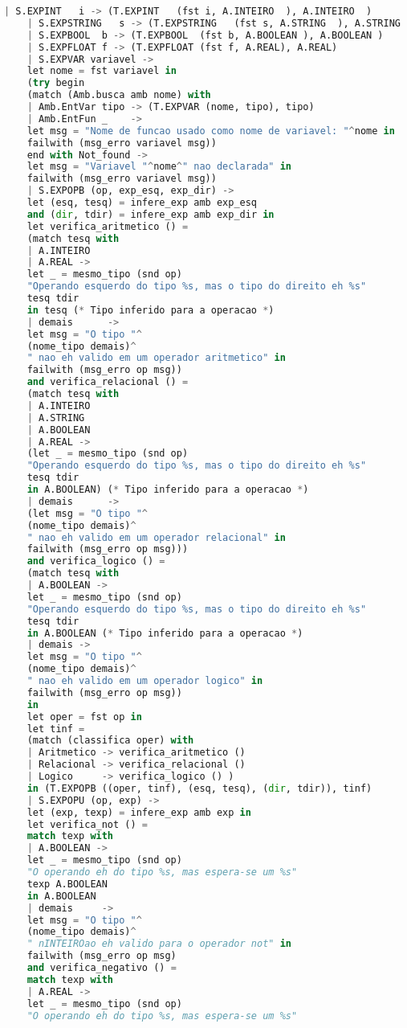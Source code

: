 \documentclass[hidelinks,12pt]{article}
\begin{document}
\begin{appendices}
\begin{lstlisting}[caption=semantico.mll, language=python]
	| S.EXPINT   i -> (T.EXPINT   (fst i, A.INTEIRO  ), A.INTEIRO  )
	| S.EXPSTRING   s -> (T.EXPSTRING   (fst s, A.STRING  ), A.STRING  )
	| S.EXPBOOL  b -> (T.EXPBOOL  (fst b, A.BOOLEAN ), A.BOOLEAN )
	| S.EXPFLOAT f -> (T.EXPFLOAT (fst f, A.REAL), A.REAL)
	| S.EXPVAR variavel ->
	let nome = fst variavel in
	(try begin
	(match (Amb.busca amb nome) with
	| Amb.EntVar tipo -> (T.EXPVAR (nome, tipo), tipo)
	| Amb.EntFun _    -> 
	let msg = "Nome de funcao usado como nome de variavel: "^nome in
	failwith (msg_erro variavel msg))
	end with Not_found ->
	let msg = "Variavel "^nome^" nao declarada" in
	failwith (msg_erro variavel msg))
	| S.EXPOPB (op, exp_esq, exp_dir) ->
	let (esq, tesq) = infere_exp amb exp_esq
	and (dir, tdir) = infere_exp amb exp_dir in
	let verifica_aritmetico () = 
	(match tesq with
	| A.INTEIRO
	| A.REAL ->
	let _ = mesmo_tipo (snd op)
	"Operando esquerdo do tipo %s, mas o tipo do direito eh %s"
	tesq tdir
	in tesq (* Tipo inferido para a operacao *)
	| demais      ->
	let msg = "O tipo "^
	(nome_tipo demais)^
	" nao eh valido em um operador aritmetico" in
	failwith (msg_erro op msg))
	and verifica_relacional () =
	(match tesq with
	| A.INTEIRO
	| A.STRING
	| A.BOOLEAN
	| A.REAL -> 
	(let _ = mesmo_tipo (snd op)
	"Operando esquerdo do tipo %s, mas o tipo do direito eh %s"
	tesq tdir
	in A.BOOLEAN) (* Tipo inferido para a operacao *)
	| demais      ->
	(let msg = "O tipo "^
	(nome_tipo demais)^
	" nao eh valido em um operador relacional" in
	failwith (msg_erro op msg)))
	and verifica_logico () = 
	(match tesq with
	| A.BOOLEAN ->
	let _ = mesmo_tipo (snd op)
	"Operando esquerdo do tipo %s, mas o tipo do direito eh %s"
	tesq tdir
	in A.BOOLEAN (* Tipo inferido para a operacao *)
	| demais ->
	let msg = "O tipo "^
	(nome_tipo demais)^
	" nao eh valido em um operador logico" in
	failwith (msg_erro op msg))
	in
	let oper = fst op in
	let tinf = 
	(match (classifica oper) with
	| Aritmetico -> verifica_aritmetico ()
	| Relacional -> verifica_relacional ()
	| Logico     -> verifica_logico () )
	in (T.EXPOPB ((oper, tinf), (esq, tesq), (dir, tdir)), tinf)
	| S.EXPOPU (op, exp) ->
	let (exp, texp) = infere_exp amb exp in
	let verifica_not () = 
	match texp with
	| A.BOOLEAN ->
	let _ = mesmo_tipo (snd op)
	"O operando eh do tipo %s, mas espera-se um %s"
	texp A.BOOLEAN
	in A.BOOLEAN
	| demais     ->
	let msg = "O tipo "^
	(nome_tipo demais)^
	" nINTEIROao eh valido para o operador not" in
	failwith (msg_erro op msg)
	and verifica_negativo () = 
	match texp with
	| A.REAL ->
	let _ = mesmo_tipo (snd op)
	"O operando eh do tipo %s, mas espera-se um %s"

\end{lstlisting}
\end{appendices}
\end{document}

